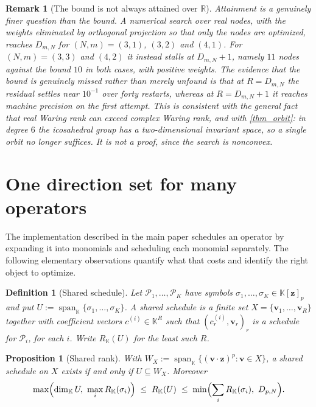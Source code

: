 \documentclass[final]{siamltex}
\DeclareMathOperator{\spanop}{span}
\newtheorem{proposition}[proposition]{Proposition}
\newtheorem{definition}[definition]{Definition}
\newtheorem{remark}[remark]{Remark}
\newcommand{\R}{\mathbb{R}}
\newcommand{\K}{\mathbb{K}}
\newcommand{\bz}{\bm{z}}
\newcommand{\bv}{\bm{v}}
\begin{document}
\begin{remark}[The bound is not always attained over $\R$]\label{rmk_realgap}
  Attainment is a genuinely finer question than the bound.  A numerical search
  over real nodes, with the weights eliminated by orthogonal projection so that
  only the nodes are optimized, reaches $D_{m,N}$ for $(N,m) = (3,1)$, $(3,2)$
  and $(4,1)$.  For $(N,m) = (3,3)$ and $(4,2)$ it instead stalls at
  $D_{m,N}+1$, namely $11$ nodes against the bound $10$ in both cases, with
  positive weights.  The evidence that the bound is genuinely missed rather than
  merely unfound is that at $R = D_{m,N}$ the residual settles near $10^{-1}$
  over forty restarts, whereas at $R = D_{m,N}+1$ it reaches machine precision
  on the first attempt.  This is consistent with the general fact that real
  Waring rank can exceed complex Waring rank, and with \cref{thm_orbit}: in
  degree $6$ the icosahedral group has a two-dimensional invariant space, so a
  single orbit no longer suffices.  It is not a proof, since the search is
  nonconvex.
\end{remark}

\section{One direction set for many operators}\label{sec_shared}

The implementation described in the main paper schedules an operator by
expanding it into monomials and scheduling each monomial separately.  The
following elementary observations quantify what that costs and identify the
right object to optimize.

\begin{definition}[Shared schedule]\label{def_shared}
  Let $\mathcal{P}_{1},\ldots,\mathcal{P}_{K}$ have symbols
  $\sigma_{1},\ldots,\sigma_{K} \in \K[\bz]_{p}$ and put
  $U := \spanop_{\K}\{\sigma_{1},\ldots,\sigma_{K}\}$.  A \emph{shared schedule}
  is a finite set $X = \{\bv_{1},\ldots,\bv_{R}\}$ together with coefficient
  vectors $c^{(i)} \in \K^{R}$ such that $(c^{(i)}_{r},\bv_{r})_{r}$ is a
  schedule for $\mathcal{P}_{i}$, for each $i$.  Write $R_{\K}(U)$ for the least
  such $R$.
\end{definition}

\begin{proposition}[Shared rank]\label{prop_shared}
  With $W_{X} := \spanop_{\K}\{(\bv\cdot\bz)^{p} : \bv \in X\}$, a shared
  schedule on $X$ exists if and only if $U \subseteq W_{X}$.  Moreover
  \begin{equation}\label{eq_shared_bounds}
    \max\Bigl(\dim_{\K} U,\ \max_{i} R_{\K}(\sigma_{i})\Bigr)
    \;\le\; R_{\K}(U)
    \;\le\; \min\Bigl(\sum_{i} R_{\K}(\sigma_{i}),\ D_{p,N}\Bigr).
  \end{equation}
\end{proposition}
\end{document}
